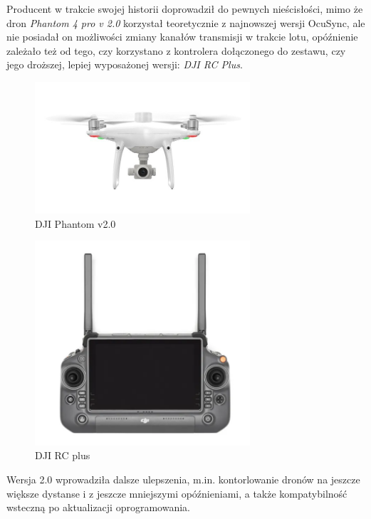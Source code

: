 \hspace{1cm}Producent w trakcie swojej historii doprowadził do pewnych nieścisłości, mimo że dron \emph{Phantom 4 pro v 2.0} korzystał teoretycznie z najnowszej wersji OcuSync, ale nie posiadał on możliwości zmiany kanałów transmisji w trakcie lotu, opóźnienie zależało też od tego, czy korzystano z kontrolera dołączonego do zestawu, czy jego droższej, lepiej wyposażonej wersji: \emph{DJI RC Plus}.
  

\begin{figure}[!ht]
  \centering
  \includegraphics[width=8cm]{./Obrazy/dji-phantom-v2.jpg}
  \caption{DJI Phantom v2.0}
  \end{figure}
  

\begin{figure}[!ht]
  \centering
  \includegraphics[width=8cm]{./Obrazy/dji-rc-plus.png}
  \caption{DJI RC plus}
  \end{figure}
  


\hspace{1cm}Wersja 2.0 wprowadziła dalsze ulepszenia, m.in. kontorlowanie dronów na jeszcze większe dystanse i z jeszcze mniejszymi opóźnieniami, a także kompatybilność wsteczną po aktualizacji oprogramowania.

